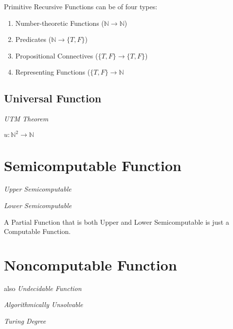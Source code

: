 Primitive Recursive Functions can be of four types: \cite{kleene52}

\begin{enumerate}
\item Number-theoretic Functions ($\mathbb{N} \rightarrow \mathbb{N}$)
\item Predicates ($\mathbb{N} \rightarrow \{T,F\}$)
\item Propositional Connectives ($\{T,F\} \rightarrow \{T,F\}$)
\item Representing Functions ($\{T,F\} \rightarrow \mathbb{N}$
\end{enumerate}



\subsection{Universal Function}\label{sec:universal_function}

\emph{UTM Theorem}

$u : \mathbb{N}^2 \rightarrow \mathbb{N}$



\section{Semicomputable Function}\label{sec:semicomputable_function}

\emph{Upper Semicomputable}

\emph{Lower Semicomputable}

A Partial Function that is both Upper and Lower Semicomputable is just
a Computable Function.



\section{Noncomputable Function}\label{sec:noncomputable_function}

also \emph{Undecidable Function}

\emph{Algorithmically Unsolvable}

\emph{Turing Degree}

